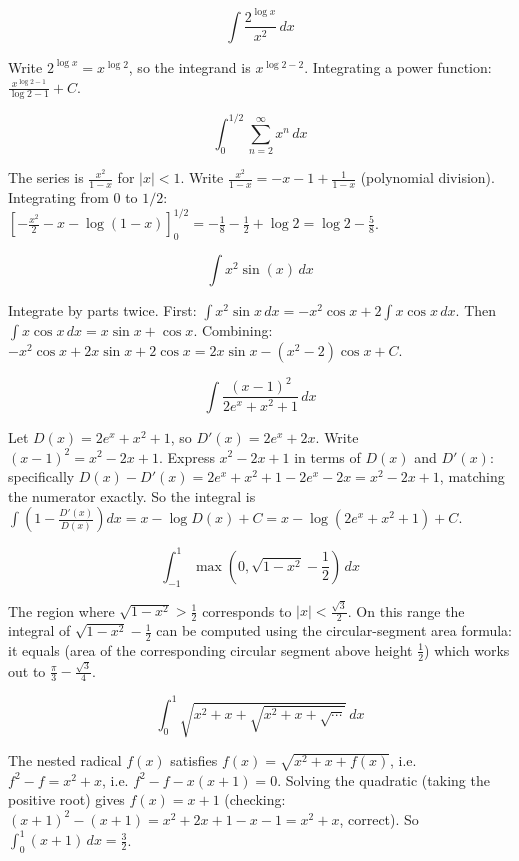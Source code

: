 \begin{questions}
\question
\[\int \frac{2^{\log x}}{x^2}\,dx\]
\begin{solution}
Write $2^{\log x} = x^{\log 2}$, so the integrand is $x^{\log2-2}$. Integrating a power function: $\frac{x^{\log2-1}}{\log2-1}+C$.
\end{solution}

\question
\[\int_0^{1/2}\sum_{n=2}^{\infty}x^n\,dx\]
\begin{solution}
The series is $\frac{x^2}{1-x}$ for $|x|<1$. Write $\frac{x^2}{1-x} = -x-1+\frac1{1-x}$ (polynomial division). Integrating from $0$ to $1/2$: $\left[-\frac{x^2}2-x-\log(1-x)\right]_0^{1/2} = -\frac18-\frac12+\log2 = \log2-\frac58$.
\end{solution}

\question
\[\int x^2\sin(x)\,dx\]
\begin{solution}
Integrate by parts twice. First: $\int x^2\sin x\,dx = -x^2\cos x+2\int x\cos x\,dx$. Then $\int x\cos x\,dx = x\sin x+\cos x$. Combining: $-x^2\cos x+2x\sin x+2\cos x = 2x\sin x-(x^2-2)\cos x+C$.
\end{solution}

\question
\[\int \frac{(x-1)^2}{2e^x+x^2+1}\,dx\]
\begin{solution}
Let $D(x)=2e^x+x^2+1$, so $D'(x)=2e^x+2x$. Write $(x-1)^2 = x^2-2x+1$. Express $x^2-2x+1$ in terms of $D(x)$ and $D'(x)$: specifically $D(x)-D'(x)= 2e^x+x^2+1-2e^x-2x = x^2-2x+1$, matching the numerator exactly. So the integral is $\int\left(1-\frac{D'(x)}{D(x)}\right)dx = x-\log D(x)+C = x-\log(2e^x+x^2+1)+C$.
\end{solution}

\question
\[\int_{-1}^1 \max\left(0,\sqrt{1-x^2}-\frac12\right)\,dx\]
\begin{solution}
The region where $\sqrt{1-x^2}>\frac12$ corresponds to $|x|<\frac{\sqrt3}2$. On this range the integral of $\sqrt{1-x^2}-\frac12$ can be computed using the circular-segment area formula: it equals (area of the corresponding circular segment above height $\frac12$) which works out to $\frac\pi3-\frac{\sqrt3}4$.
\end{solution}

\question
\[\int_0^1 \sqrt{x^2+x+\sqrt{x^2+x+\sqrt{\cdots}}}\,dx\]
\begin{solution}
The nested radical $f(x)$ satisfies $f(x)=\sqrt{x^2+x+f(x)}$, i.e. $f^2-f = x^2+x$, i.e. $f^2-f-x(x+1)=0$. Solving the quadratic (taking the positive root) gives $f(x)=x+1$ (checking: $(x+1)^2-(x+1)=x^2+2x+1-x-1=x^2+x$, correct). So $\int_0^1(x+1)\,dx = \frac32$.
\end{solution}


\end{questions}
